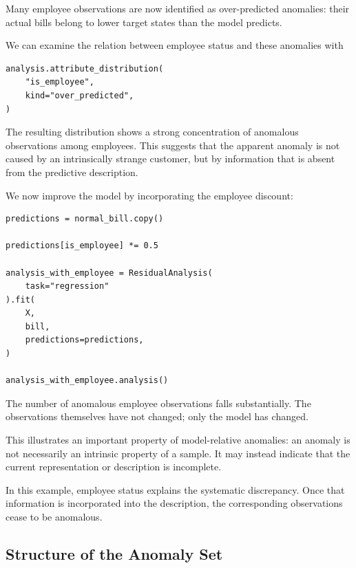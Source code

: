 \begin{example}
Many employee observations are now identified as over-predicted anomalies:
their actual bills belong to lower target states than the model predicts.

We can examine the relation between employee status and these anomalies with

\begin{sourcecode}
{\scriptsize
\begin{verbatim}
analysis.attribute_distribution(
    "is_employee",
    kind="over_predicted",
)
\end{verbatim}}
\end{sourcecode}

The resulting distribution shows a strong concentration of anomalous
observations among employees. This suggests that the apparent anomaly is not
caused by an intrinsically strange customer, but by information that is absent
from the predictive description.

We now improve the model by incorporating the employee discount:

\begin{sourcecode}
{\scriptsize
\begin{verbatim}
predictions = normal_bill.copy()

predictions[is_employee] *= 0.5

analysis_with_employee = ResidualAnalysis(
    task="regression"
).fit(
    X,
    bill,
    predictions=predictions,
)

analysis_with_employee.analysis()
\end{verbatim}}
\end{sourcecode}

The number of anomalous employee observations falls substantially. The
observations themselves have not changed; only the model has changed.

This illustrates an important property of model-relative anomalies: an anomaly
is not necessarily an intrinsic property of a sample. It may instead indicate
that the current representation or description is incomplete.

In this example, employee status explains the systematic discrepancy. Once
that information is incorporated into the description, the corresponding
observations cease to be anomalous.
\end{example}

\subsection*{Structure of the Anomaly Set}

